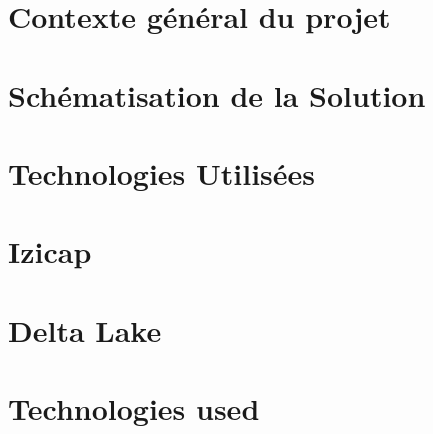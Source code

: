 \documentclass{iid}
\begin{document}
\ifnum{}
    \chapter{Contexte général du projet}\label{chap:1}
    \minitoc
    
    \chapter{Schématisation de la Solution}\label{chap:2}
    
    
    \chapter{Technologies Utilisées}\label{chap:3}

    
\else
    \chapter{Izicap}\label{chap:1}
    \minitoc
    
    \chapter{Delta Lake}\label{chap:2}
    
    
    \chapter{Technologies used}\label{chap:3}

    
\fi
 
% 

% 
\lhead[]{} \rhead[]{} \chead[]{}

% 
% 


%
\end{document}

